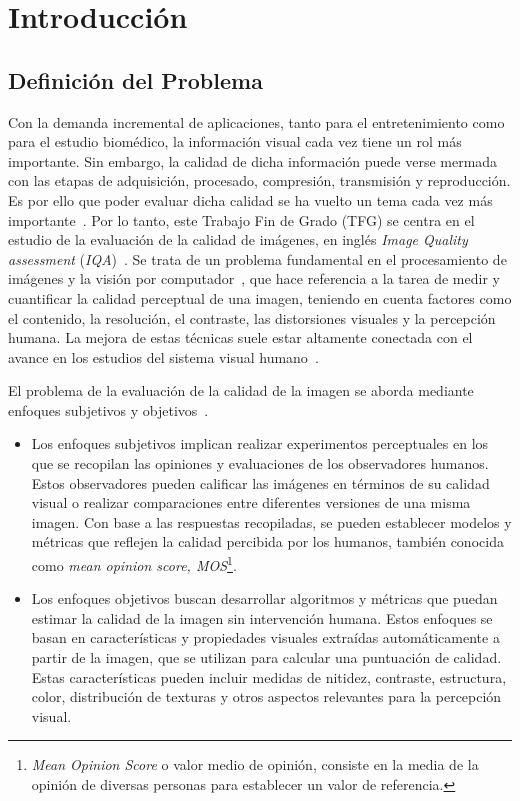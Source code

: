 \chapter{Introducción}
\section{Definición del Problema}   
Con la demanda incremental de aplicaciones, tanto para el entretenimiento 
como para el estudio biomédico, la información visual cada vez tiene un rol 
más importante. Sin embargo, la calidad de dicha información puede 
verse mermada con las etapas de adquisición, procesado, compresión, transmisión y reproducción.
Es por ello que poder evaluar dicha calidad se ha vuelto un 
tema cada vez más importante~\cite{RecentIQASurvey, IQABook, VisualMedicalQualityBook}.
Por lo tanto, este Trabajo Fin de Grado (TFG) se centra en el estudio de la 
evaluación de la calidad de imágenes,
en inglés \emph{Image Quality assessment} (\emph{IQA})~\cite{MinkowskiFailure}.
Se trata de un problema fundamental en el procesamiento de imágenes y la visión 
por computador~\cite{CVAlgorithms,CVGeometry,CVModern,CVProcessing}, que hace referencia a la tarea de medir y cuantificar 
la calidad perceptual de una imagen, 
teniendo en cuenta factores como el contenido, la resolución, 
el contraste, las distorsiones visuales y la percepción humana. 
La mejora de estas técnicas suele estar altamente conectada con el avance 
en los estudios del sistema visual humano~\cite{Wang2006ModernIQ}.
 
El problema de la evaluación de la calidad de la imagen se aborda mediante enfoques 
subjetivos y objetivos~\cite{Wang2006ModernIQ}.
\begin{itemize}
  \item Los enfoques subjetivos implican realizar experimentos 
perceptuales en los que se recopilan las opiniones y evaluaciones de los observadores 
humanos. Estos observadores pueden calificar las imágenes en términos de su 
calidad visual o realizar comparaciones entre diferentes versiones de una misma imagen. 
Con base a las respuestas recopiladas, se pueden establecer modelos y 
métricas que reflejen la calidad percibida por los humanos, también conocida
como \emph{mean opinion score, MOS}\footnote{
\emph{Mean Opinion Score} o valor medio de opinión, consiste en 
la media de la opinión de diversas personas para establecer un valor de referencia. 
}.
\item Los enfoques objetivos buscan desarrollar algoritmos y métricas 
que puedan estimar la calidad de la imagen sin intervención humana. 
Estos enfoques se basan en características y propiedades visuales extraídas automáticamente a partir de la 
imagen, que se utilizan para calcular una puntuación de calidad. Estas características 
pueden incluir medidas de nitidez, contraste, estructura, color, distribución de 
texturas y otros aspectos relevantes para la percepción visual.
\end{itemize}
 

